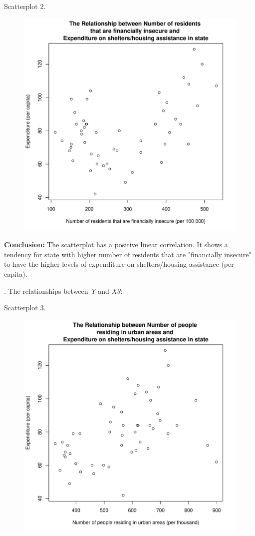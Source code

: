 \documentclass[12pt,letterpaper]{article}
\begin{document}
\noindent Scatterplot 2.
\begin{figure}[h!]\centering
	\caption{\footnotesize }
	\label{fig:plot_1}
	\includegraphics[width=.75\textwidth]{plot1_2.pdf}
\end{figure}

\noindent \textbf{Conclusion:} The scatterplot has a positive linear correlation. It shows a tendency for state with higher number of residents that are "financially insecure" to have the higher levels of expenditure on shelters/housing assistance (per capita).
\vspace{.5cm}

\newpage
{}. The relationships between \emph{Y} and \emph{X3}:
  

\noindent Scatterplot 3. 
\begin{figure}[h!]\centering
	\caption{\footnotesize }
	\label{fig:plot_1}
	\includegraphics[width=.75\textwidth]{plot1_3.pdf}
\end{figure}
\end{document}
